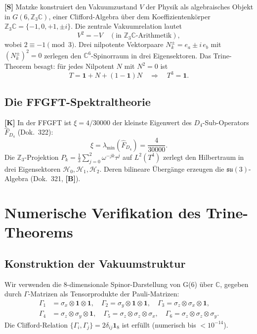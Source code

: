 \textbf{[S]} Matzke konstruiert den Vakuumzustand $V$ der Physik als
algebraisches Objekt in $G(6, \mathbb{Z}_3\mathbb{C})$, einer
Clifford-Algebra über dem Koeffizientenkörper
$\mathbb{Z}_3\mathbb{C} = \{-1, 0, +1, \pm i\}$.
Die zentrale Vakuumrelation lautet
\begin{equation}
  V^2 = -V \quad (\text{in } \mathbb{Z}_3\mathbb{C}\text{-Arithmetik}),
  \label{eq:vakrel}
\end{equation}
wobei $2 \equiv -1 \pmod{3}$. Drei nilpotente Vektorpaare
$N_k^{\pm} = e_a \pm i\,e_b$ mit $(N_k^\pm)^2 = 0$ zerlegen den
$\mathbb{C}^6$-Spinorraum in drei Eigensektoren.
Das Trine-Theorem besagt: für jedes Nilpotent $N$ mit $N^2 = 0$ ist
\begin{equation}
  T = \mathbf{1} + N + (1-\mathbf{1})N \quad \Rightarrow \quad T^3 = \mathbf{1}.
  \label{eq:trine}
\end{equation}

\subsection{Die FFGFT-Spektraltheorie}

\textbf{[K]} In der FFGFT ist $\xi = 4/30000$ der kleinste Eigenwert
des $D_4$-Sub-Operators $\hat{F}_{D_4}$ (Dok.~322):
\begin{equation}
  \xi = \lambda_{\min}(\hat{F}_{D_4}) = \frac{4}{30000}.
  \label{eq:xi_eigen}
\end{equation}
Die $\mathbb{Z}_3$-Projektion $P_k = \frac{1}{3}\sum_{j=0}^2 \omega^{-jk}\tau^j$
auf $L^2(T^4)$ zerlegt den Hilbertraum in drei Eigensektoren
$\mathcal{H}_0, \mathcal{H}_1, \mathcal{H}_2$. Deren bilineare Übergänge
erzeugen die $\mathfrak{su}(3)$-Algebra (Dok.~321, \textbf{[B]}).

\section{Numerische Verifikation des Trine-Theorems}

\subsection{Konstruktion der Vakuumstruktur}

Wir verwenden die 8-dimensionale Spinor-Darstellung von G(6) über $\mathbb{C}$,
gegeben durch $\Gamma$-Matrizen als Tensorprodukte der Pauli-Matrizen:
\begin{align}
  \Gamma_1 &= \sigma_x\otimes\mathbf{1}\otimes\mathbf{1}, \quad
  \Gamma_2 = \sigma_y\otimes\mathbf{1}\otimes\mathbf{1}, \quad
  \Gamma_3 = \sigma_z\otimes\sigma_x\otimes\mathbf{1}, \nonumber\\
  \Gamma_4 &= \sigma_z\otimes\sigma_y\otimes\mathbf{1}, \quad
  \Gamma_5 = \sigma_z\otimes\sigma_z\otimes\sigma_x, \quad
  \Gamma_6 = \sigma_z\otimes\sigma_z\otimes\sigma_y.
\end{align}
Die Clifford-Relation $\{\Gamma_i, \Gamma_j\} = 2\delta_{ij}\mathbf{1}_8$
ist erfüllt (numerisch bis $< 10^{-14}$).

